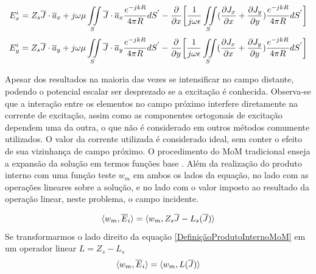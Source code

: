 \documentclass[
	12pt,				%
	openright,			%
	oneside,			%
	a4papey79r,			%
	english,			%
	brazil				%
	]{abntex2}
\begin{document}
\begin{equation}{\label{CampoExTangencialEmFunçãoJ}}
  E_{x}^i=Z_s \overline{J}\cdot \overline{a}_x+j\omega \mu \iint\limits_S \overline{J}\cdot \overline{a}_x\frac{e^{-j k R}}{4 \pi R} dS^{'} -
     \frac{\partial }{\partial x}  \biggl[ \frac{1}{j\omega \epsilon}\iint\limits_S  (\frac{\partial J_x}{\partial x}+ \frac{\partial J_y}{\partial y} ) \frac{e^{-j k R}}{4 \pi R} dS^{'}  \biggl] 
\end{equation}
\begin{equation}{\label{CampoEyTangencialEmFunçãoJ}}
  E_{y}^i=Z_s \overline{J}\cdot \overline{a}_y+j\omega \mu \iint\limits_S \overline{J}\cdot \overline{a}_y \frac{e^{-j k R}}{4 \pi R} dS^{'} -
     \frac{\partial }{\partial y}  \biggl[ \frac{1}{j\omega \epsilon}\iint\limits_S  (\frac{\partial J_x}{\partial x}+ \frac{\partial J_y}{\partial y} ) \frac{e^{-j k R}}{4 \pi R} dS^{'}  \biggl] 
\end{equation}

Apesar dos resultados na maioria das vezes se intensificar no campo distante, podendo o potencial escalar ser desprezado se a excitação é conhecida. Observa-se que a interação entre os elementos no campo próximo interfere diretamente na corrente de excitação, assim como as componentes ortogonais de excitação dependem uma da outra, o que não é considerado em outros métodos comumente utilizados. O valor da corrente utilizada é considerado ideal, sem conter o efeito de sua vizinhança de campo próximo.
O procedimento do MoM tradicional enseja a expansão da solução em termos funções base . Além da realização do produto interno com uma função teste $w_m$ em ambos os lados da equação, no lado com as operações lineares sobre a solução, e no lado com o valor imposto ao resultado da operação linear, neste problema, o campo incidente.

\begin{equation}{\label{DefiniçãoProdutoInternoMoM}}
    \langle w_m,\overline{E}_i \rangle=  \langle w_m,Z_s\overline{J}-L_s(\overline{J})\rangle
\end{equation}
Se transformarmos o lado direito da equação \ref{DefiniçãoProdutoInternoMoM} em um operador linear $L=Z_s -L_s$ 
\begin{equation}{\label{DefiniçãoProdutoInternoLMoM}}
 \langle w_m,\overline{E}_i \rangle=  \langle w_m,L(\overline{J})\rangle
\end{equation}
\end{document}
